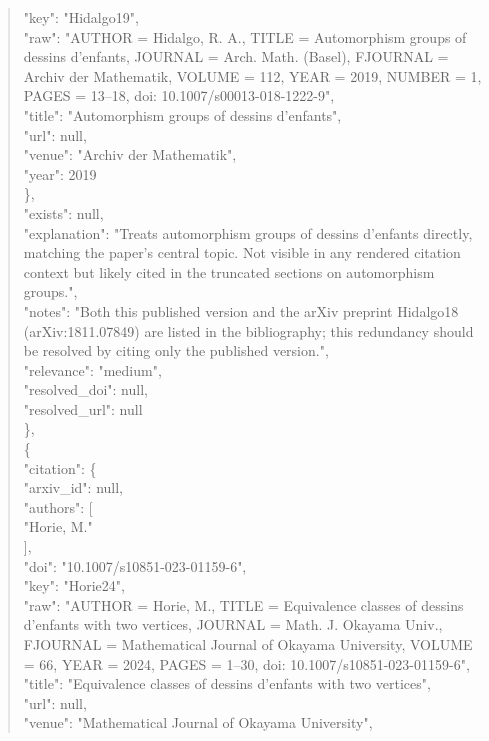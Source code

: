 \documentclass[11pt]{article}
\begin{document}
\begin{quote}
        "key": "Hidalgo19",\\
        "raw": "AUTHOR = Hidalgo, R. A., TITLE = Automorphism groups of dessins d'enfants, JOURNAL = Arch. Math. (Basel), FJOURNAL = Archiv der Mathematik, VOLUME = 112, YEAR = 2019, NUMBER = 1, PAGES = 13--18, doi: 10.1007/s00013-018-1222-9",\\
        "title": "Automorphism groups of dessins d'enfants",\\
        "url": null,\\
        "venue": "Archiv der Mathematik",\\
        "year": 2019\\
      \},\\
      "exists": null,\\
      "explanation": "Treats automorphism groups of dessins d'enfants directly, matching the paper's central topic. Not visible in any rendered citation context but likely cited in the truncated sections on automorphism groups.",\\
      "notes": "Both this published version and the arXiv preprint Hidalgo18 (arXiv:1811.07849) are listed in the bibliography; this redundancy should be resolved by citing only the published version.",\\
      "relevance": "medium",\\
      "resolved\_doi": null,\\
      "resolved\_url": null\\
    \},\\
    \{\\
      "citation": \{\\
        "arxiv\_id": null,\\
        "authors": [\\
          "Horie, M."\\
        ],\\
        "doi": "10.1007/s10851-023-01159-6",\\
        "key": "Horie24",\\
        "raw": "AUTHOR = Horie, M., TITLE = Equivalence classes of dessins d'enfants with two vertices, JOURNAL = Math. J. Okayama Univ., FJOURNAL = Mathematical Journal of Okayama University, VOLUME = 66, YEAR = 2024, PAGES = 1--30, doi: 10.1007/s10851-023-01159-6",\\
        "title": "Equivalence classes of dessins d'enfants with two vertices",\\
        "url": null,\\
        "venue": "Mathematical Journal of Okayama University",\\

\end{quote}
\end{document}
